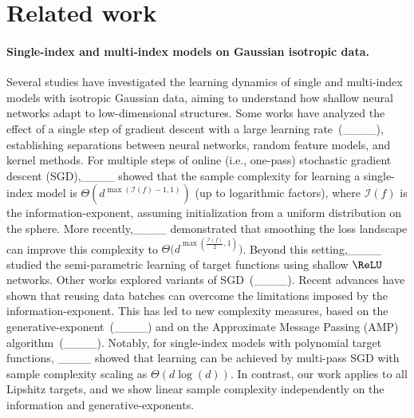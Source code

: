 \section{Related work}

\paragraph{Single-index and multi-index models on Gaussian isotropic data.} Several studies have investigated the learning dynamics of single and multi-index models with isotropic Gaussian data, aiming to understand how shallow neural networks adapt to low-dimensional structures. Some works have analyzed the effect of a single step of gradient descent with a large learning rate~(____), establishing separations between neural networks, random feature models, and kernel methods. For multiple steps of online (i.e., one-pass) stochastic gradient descent (SGD),____ showed that the sample complexity for learning a single-index model is $\Theta\left(d^{\max(\mathcal{I}(f)-1,1)}\right)$ (up to logarithmic factors), where $\mathcal{I}(f)$ is the information-exponent, assuming initialization from a uniform distribution on the sphere. More recently,____ demonstrated that smoothing the loss landscape can improve this complexity to $\Theta\Big(d^{\max(\frac{\mathcal{I}(f)}{2},1)}\Big)$. Beyond this setting,____ studied the semi-parametric learning of target functions using shallow $\ReLU$ networks. Other works explored variants of SGD~(____). Recent advances have shown that reusing data batches can overcome the limitations imposed by the information-exponent. This has led to new complexity measures, based on the generative-exponent~(____) and on the Approximate Message Passing (AMP) algorithm~(____). Notably, for single-index models with polynomial target functions, ____ showed that learning can be achieved by multi-pass SGD with sample complexity scaling as $\Theta(d \log(d))$. In contrast, our work applies to all Lipshitz targets, and we show linear sample complexity independently on the information and generative-exponents.


